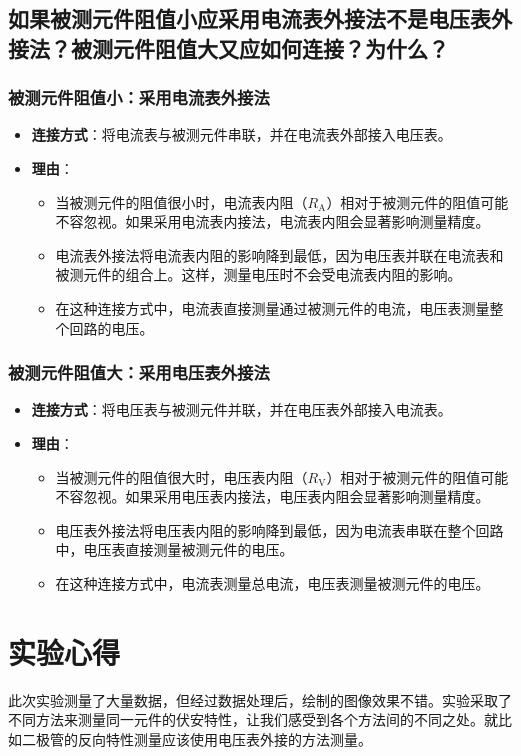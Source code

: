 \documentclass[a4paper,utf8]{article}
\begin{document}
\subsection{如果被测元件阻值小应采用电流表外接法不是电压表外接法？被测元件阻值大又应如何连接？为什么？}
\subsubsection{被测元件阻值小：采用电流表外接法}
\begin{itemize}
    \item \textbf{连接方式}：将电流表与被测元件串联，并在电流表外部接入电压表。
    \item \textbf{理由}：
    \begin{itemize}
        \item 当被测元件的阻值很小时，电流表内阻（$R_\text{A}$）相对于被测元件的阻值可能不容忽视。如果采用电流表内接法，电流表内阻会显著影响测量精度。
        \item 电流表外接法将电流表内阻的影响降到最低，因为电压表并联在电流表和被测元件的组合上。这样，测量电压时不会受电流表内阻的影响。
        \item 在这种连接方式中，电流表直接测量通过被测元件的电流，电压表测量整个回路的电压。
    \end{itemize}
\end{itemize}

\subsubsection{被测元件阻值大：采用电压表外接法}

\begin{itemize}
    \item \textbf{连接方式}：将电压表与被测元件并联，并在电压表外部接入电流表。
    \item \textbf{理由}：
    \begin{itemize}
        \item 当被测元件的阻值很大时，电压表内阻（$R_\text{V}$）相对于被测元件的阻值可能不容忽视。如果采用电压表内接法，电压表内阻会显著影响测量精度。
        \item 电压表外接法将电压表内阻的影响降到最低，因为电流表串联在整个回路中，电压表直接测量被测元件的电压。
        \item 在这种连接方式中，电流表测量总电流，电压表测量被测元件的电压。
    \end{itemize}
\end{itemize}

\section{实验心得}
此次实验测量了大量数据，但经过数据处理后，绘制的图像效果不错。实验采取了不同方法来测量同一元件的伏安特性，让我们感受到各个方法间的不同之处。就比如二极管的反向特性测量应该使用电压表外接的方法测量。
\end{document}
